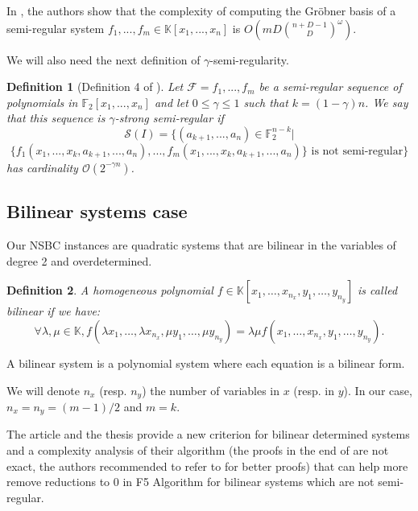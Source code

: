 \documentclass[english]{article}
\newtheorem{definition}{Definition}[section]
\begin{document}
		In \cite{BFS15}, the authors show that the complexity of computing the Gröbner basis of a semi-regular system $f_1,...,f_m \in \mathbb{K}[x_1,...,x_n]$ is $O\left(mD\binom{n+D-1}{D}^\omega \right)$.
		
		
		We will also need the next definition of $\gamma$-semi-regularity.
		
		 \begin{definition}[Definition 4 of \cite{VID24}]
			Let $\mathcal{F} = {f_1,...,f_m}$ be a semi-regular sequence of polynomials in $\mathbb{F}_2[x_1,...,x_n]$ and let $0 \leq \gamma \leq 1$ such that $k = (1 - \gamma)n$. We say that this sequence is $\gamma$-strong semi-regular if
			$$
			\mathcal{S}(I) = \{(a_{k+1},...,a_n) \in \mathbb{F}_{2}^{n-k} |
			$$
			$$
			\{f_1(x_1,...,x_k,a_{k+1},...,a_n),...,f_m(x_1,...,x_k,a_{k+1},...,a_n)\} \text{ is not semi-regular}\}
			$$
			has cardinality $\mathcal{O}(2^{-\gamma n})$.
		\end{definition}
		
		\subsection{Bilinear systems case}
		Our NSBC instances are quadratic systems that are bilinear in the variables of degree 2 and overdetermined.
		
		\begin{definition}
			A homogeneous polynomial $f \in \mathbb{K}[x_1,\dots,x_{n_x},y_1,\dots,y_{n_y}]$ is called bilinear if we have:
			$$
				\forall \lambda, \mu \in \mathbb{K}, f(\lambda x_1,\dots,\lambda x_{n_x}, \mu y_1,\dots, \mu y_{n_y}) = \lambda \mu f(x_1,\dots,x_{n_x},y_1,\dots,y_{n_y}).
			$$
		\end{definition}
		
		A bilinear system is a polynomial system where each equation is a bilinear form.
		
		We will denote $n_x$ (resp. $n_y$) the number of variables in $x$ (resp. in $y$). In our case, $n_x = n_y = (m-1)/2$ and $m = k$.
		
		The article \cite{FSS11} and the thesis \cite{Spaen2012} provide a new criterion for bilinear determined systems and a complexity analysis of their algorithm (the proofs in the end of \cite{FSS11} are not exact, the authors recommended to refer to \cite{Spaen2012} for better proofs) that can help more remove reductions to 0 in F5 Algorithm for bilinear systems which are not semi-regular.
		
\end{document}
